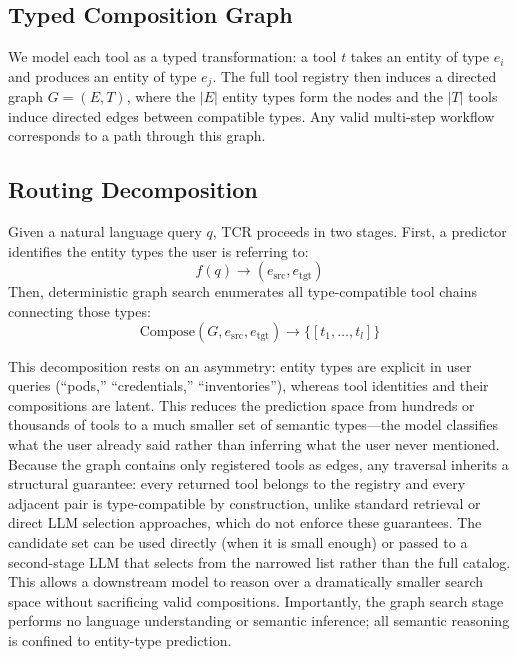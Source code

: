 \documentclass{article}
\begin{document}
\subsection{Typed Composition Graph}

We model each tool as a typed transformation: a tool $t$ takes an entity of type $e_i$ and produces an entity of type $e_j$. The full tool registry then induces a directed graph $G = (E, T)$, where the $|E|$ entity types form the nodes and the $|T|$ tools induce directed edges between compatible types. Any valid multi-step workflow corresponds to a path through this graph.

\subsection{Routing Decomposition}

Given a natural language query $q$, TCR proceeds in two stages. First, a predictor identifies the entity types the user is referring to:
\begin{equation}
  f(q) \rightarrow (e_{\text{src}}, e_{\text{tgt}})
\end{equation}
Then, deterministic graph search enumerates all type-compatible tool chains connecting those types:
\begin{equation}
  \text{Compose}(G, e_{\text{src}}, e_{\text{tgt}}) \rightarrow \{[t_1, \ldots, t_l]\}
\end{equation}

This decomposition rests on an asymmetry: entity types are explicit in user queries (``pods,'' ``credentials,'' ``inventories''), whereas tool identities and their compositions are latent. This reduces the prediction space from hundreds or thousands of tools to a much smaller set of semantic types---the model classifies what the user already said rather than inferring what the user never mentioned. Because the graph contains only registered tools as edges, any traversal inherits a structural guarantee: every returned tool belongs to the registry and every adjacent pair is type-compatible by construction, unlike standard retrieval or direct LLM selection approaches, which do not enforce these guarantees. The candidate set can be used directly (when it is small enough) or passed to a second-stage LLM that selects from the narrowed list rather than the full catalog. This allows a downstream model to reason over a dramatically smaller search space without sacrificing valid compositions. Importantly, the graph search stage performs no language understanding or semantic inference; all semantic reasoning is confined to entity-type prediction.
\end{document}
